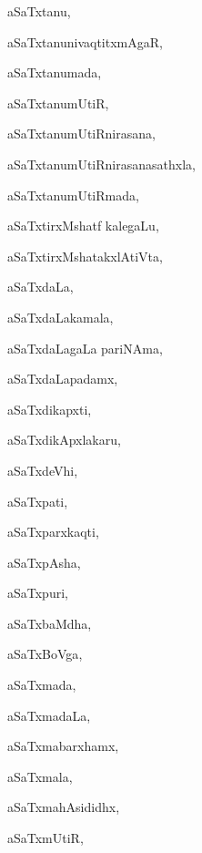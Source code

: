 \begin{multicols}{3}
{\noindent
{aSaTxtanu}, \pageref{aSaTxtanu}

\noindent
{aSaTxtanunivaqtitxmAgaR}, \pageref{aSaTxtanunivaqtitxmAgaR}

\noindent
{aSaTxtanumada}, \pageref{aSaTxtanumada}

\noindent
{aSaTxtanumUtiR}, \pageref{aSaTxtanumUtiR}

\noindent
{aSaTxtanumUtiRnirasana}, \pageref{aSaTxtanumUtiRnirasana}

\noindent
{aSaTxtanumUtiRnirasanasathxla}, \pageref{aSaTxtanumUtiRnirasanasathxla}

\noindent
{aSaTxtanumUtiRmada}, \pageref{aSaTxtanumUtiRmada}

\noindent
{aSaTxtirxMshatf kalegaLu}, \pageref{aSaTxtirxMshatf kalegaLu}

\noindent
{aSaTxtirxMshatakxlAtiVta}, \pageref{aSaTxtirxMshatakxlAtiVta}

\noindent
{aSaTxdaLa}, \pageref{aSaTxdaLa}

\noindent
{aSaTxdaLakamala}, \pageref{aSaTxdaLakamala}

\noindent
{aSaTxdaLagaLa pariNAma}, \pageref{aSaTxdaLagaLa pariNAma}

\noindent
{aSaTxdaLapadamx}, \pageref{aSaTxdaLapadamx}

\noindent
{aSaTxdikapxti}, \pageref{aSaTxdikapxti}

\noindent
{aSaTxdikApxlakaru}, \pageref{aSaTxdikApxlakaru}

\noindent
{aSaTxdeVhi}, \pageref{aSaTxdeVhi}

\noindent
{aSaTxpati}, \pageref{aSaTxpati}

\noindent
{aSaTxparxkaqti}, \pageref{aSaTxparxkaqti}

\noindent
{aSaTxpAsha}, \pageref{aSaTxpAsha}

\noindent
{aSaTxpuri}, \pageref{aSaTxpuri}

\noindent
{aSaTxbaMdha}, \pageref{aSaTxbaMdha}

\noindent
{aSaTxBoVga}, \pageref{aSaTxBoVga}

\noindent
{aSaTxmada}, \pageref{aSaTxmada}

\noindent
{aSaTxmadaLa}, \pageref{aSaTxmadaLa}

\noindent
{aSaTxmabarxhamx}, \pageref{aSaTxmabarxhamx}

\noindent
{aSaTxmala}, \pageref{aSaTxmala}

\noindent
{aSaTxmahAsididhx}, \pageref{aSaTxmahAsididhx}

\noindent
{aSaTxmUtiR}, \pageref{aSaTxmUtiR}

}
\end{multicols}
